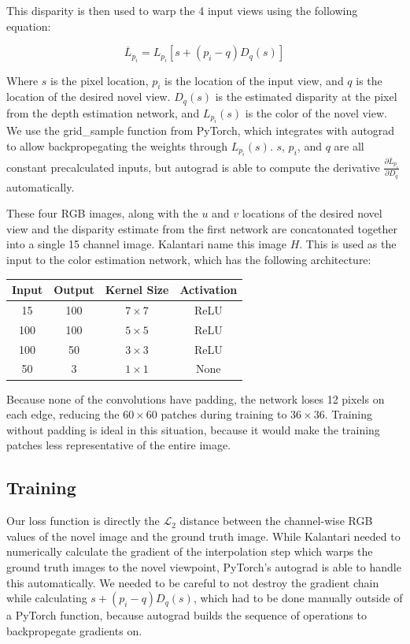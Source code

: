 \documentclass[10pt,twocolumn,letterpaper]{article}
\begin{document}
This disparity is then used to warp the 4 input views using the following equation:

$$
\overline{L}_{p_i} = L_{p_i} \left[ s + \left(p_i - q\right) D_q(s) \right]
$$

Where $s$ is the pixel location, $p_i$ is the location of the input view, and $q$ is the location of the
desired novel view. $D_q(s)$ is the estimated disparity at the pixel from the depth estimation network,
and $L_{p_i}(s)$ is the color of the novel view. We use the grid\_sample function from PyTorch, which integrates
with autograd to allow backpropegating the weights through $L_{p_i}(s)$. $s$, $p_i$, and $q$ are all 
constant precalculated inputs, but autograd is able to compute the derivative 
$\frac{\partial \overline{L}_{p_i}}{\partial D_q}$ automatically. 

These four RGB images, along with the $u$ and $v$ 
locations of the desired novel view and the disparity estimate from the first network are concatonated
together into a single 15 channel image. Kalantari \etal name this image $H$. This is used as the input to the color estimation network, which
has the following architecture:

\begin{center}
\begin{tabular}{|c c c c|}
    \hline
    Input & Output & Kernel Size & Activation \\
    \hline
    15 & 100 & $7 \times 7$ & ReLU \\
    100 & 100 & $5 \times 5$ & ReLU \\
    100 & 50 & $3 \times 3$ & ReLU \\
    50 & 3 & $1 \times 1$ & None \\
    \hline
\end{tabular}
\end{center}

Because none of the convolutions have padding, the network loses 12 pixels on each edge, reducing
the $60 \times 60$ patches during training to $36 \times 36$. Training without padding is ideal in this situation, 
because it would make the training patches less representative of the entire image.

\subsection{Training}

Our loss function is directly the $\mathcal{L}_2$ distance between the channel-wise RGB values of the novel image
and the ground truth image. While Kalantari \etal needed to numerically calculate the gradient of the interpolation
step which warps the ground truth images to the novel viewpoint, PyTorch's autograd is able to handle this automatically.
We needed to be careful to not destroy the gradient chain while calculating $s + \left(p_i - q\right) D_q(s)$, which had
to be done manually outside of a PyTorch function, because autograd builds the sequence of 
operations to backpropegate gradients on.
\end{document}
